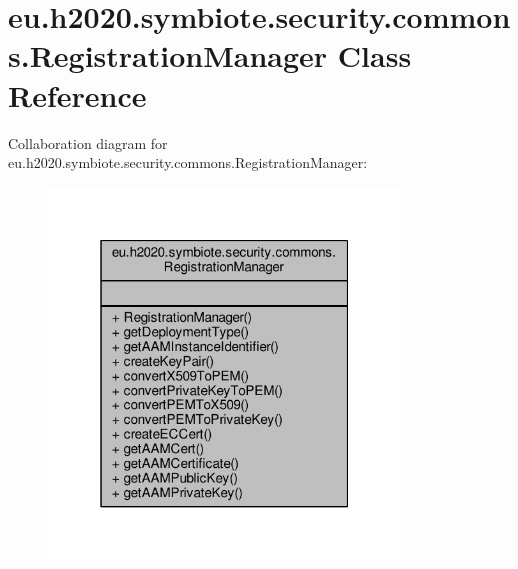 \hypertarget{classeu_1_1h2020_1_1symbiote_1_1security_1_1commons_1_1RegistrationManager}{}\section{eu.\+h2020.\+symbiote.\+security.\+commons.\+Registration\+Manager Class Reference}
\label{classeu_1_1h2020_1_1symbiote_1_1security_1_1commons_1_1RegistrationManager}


Collaboration diagram for eu.\+h2020.\+symbiote.\+security.\+commons.\+Registration\+Manager\+:
\nopagebreak
\begin{figure}[H]
\begin{center}
\leavevmode
\includegraphics[width=265pt]{classeu_1_1h2020_1_1symbiote_1_1security_1_1commons_1_1RegistrationManager__coll__graph}
\end{center}
\end{figure}
